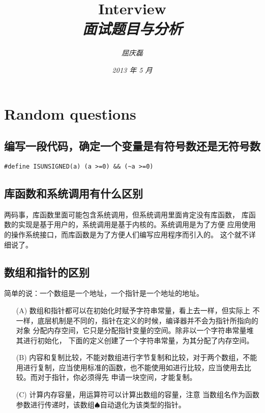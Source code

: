 \documentclass{article}
\begin{document}
\title{%
  {\huge \textsf{Interview}\\\smallskip}%
  {\small \textit{面试题目与分析}}
}

\author{\textit{屈庆磊}\\[2mm]
       }

\date{\textit{2013 年 5 月}}

\maketitle
\newpage
\begin{multicols}{2}
\tableofcontents
\end{multicols}
\newpage 

\section{Random questions}
\subsection{编写一段代码，确定一个变量是有符号数还是无符号数}
\begin{verbatim}
#define ISUNSIGNED(a) (a >=0) && (~a >=0)
\end{verbatim}

\subsection{库函数和系统调用有什么区别}
两码事，库函数里面可能包含系统调用，但系统调用里面肯定没有库函数，
库函数的实现是基于用户的，系统调用是基于内核的。系统调用是为了方便
应用使用的操作系统接口，而库函数是为了方便人们编写应用程序而引入的。
这个就不详细说了。

\subsection{数组和指针的区别}
简单的说：一个数组是一个地址，一个指针是一个地址的地址。
\begin{itemize}
\item[(A)] 数组和指针都可以在初始化时赋予字符串常量，看上去一样，但实际上
不一样，底层机制是不同的，指针在定义的时候，编译器并不会为指针所指向的对象
分配内存空间，它只是分配指针变量的空间。除非以一个字符串常量堆其进行初始化，
下面的定义创建了一个字符串常量，为其分配了内存空间。
\item[(B)] 内容和复制比较，不能对数组进行字节复制和比较，对于两个数组，不能
用进行复制，应当使用标准的函数，也不能使用如进行比较，应当使用去比较。而对于指针，你必须得先
申请一块空间，才能复制。
\item[(C)] 计算内存容量，用运算符可以计算出数组的容量，注意
当数组名作为函数参数进行传递时，该数组$\spadesuit$自动退化为该类型的指针。
\end{itemize}
\end{document}
